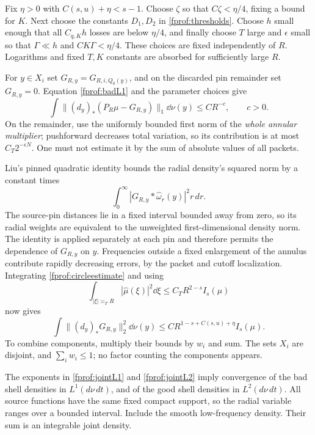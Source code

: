 Fix \(\eta>0\) with \(C(s,u)+\eta<s-1\). Choose \(\zeta\) so that \(C\zeta<\eta/4\), fixing a bound for \(K\). Next choose the constants \(D_1,D_2\) in \eqref{fprof:thresholds}. Choose \(h\) small enough that all \(C_{q,K}h\) losses are below \(\eta/4\), and finally choose \(T\) large and \(\epsilon\) small so that \(\Gamma\ll h\) and \(CK\Gamma<\eta/4\). These choices are fixed independently of \(R\). Logarithms and fixed \(T,K\) constants are absorbed for sufficiently large \(R\).

For \(y\in X_i\) set \(G_{R,y}=G_{R,i,Q_0(y)}\), and on the discarded pin remainder set \(G_{R,y}=0\). Equation \eqref{fprof:badL1} and the parameter choices give
\begin{equation}\label{fprof:jointL1}
 \int\|(d_y)_*(P_R\mu-G_{R,y})\|_1\dd\nu(y)\leq C R^{-c},
 \qquad c>0.
\end{equation}
On the remainder, use the uniformly bounded first norm of the \emph{whole annular multiplier}; pushforward decreases total variation, so its contribution is at most \(C_T2^{-\epsilon N}\). One must not estimate it by the sum of absolute values of all packets.

Liu's pinned quadratic identity \cite{liuidentity} bounds the radial density's squared norm by a constant times
$$
 \int_0^\infty |G_{R,y}*\widehat\omega_r(y)|^2r\,dr.
$$
The source-pin distances lie in a fixed interval bounded away from zero, so its radial weights are equivalent to the unweighted first-dimensional density norm. The identity is applied separately at each pin and therefore permits the dependence of \(G_{R,y}\) on \(y\). Frequencies outside a fixed enlargement of the annulus contribute rapidly decreasing errors, by the packet and cutoff localization. Integrating \eqref{fprof:circleestimate} and using
$$
 \int_{|\xi|\asymp_T R}|\widehat\mu(\xi)|^2\dd\xi
 \leq C_T R^{2-s}I_s(\mu)
$$
now gives
\begin{equation}\label{fprof:jointL2}
 \int\|(d_y)_*G_{R,y}\|_2^2\dd\nu(y)
 \leq C R^{1-s+C(s,u)+\eta}I_s(\mu).
\end{equation}
To combine components, multiply their bounds by \(w_i\) and sum. The sets \(X_i\) are disjoint, and \(\sum_iw_i\leq1\); no factor counting the components appears.

The exponents in \eqref{fprof:jointL1} and \eqref{fprof:jointL2} imply convergence of the bad shell densities in \(L^1(d\nu\,dt)\), and of the good shell densities in \(L^2(d\nu\,dt)\). All source functions have the same fixed compact support, so the radial variable ranges over a bounded interval. Include the smooth low-frequency density. Their sum is an integrable joint density.

